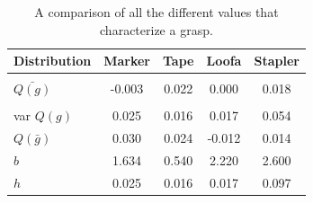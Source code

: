 \documentclass[letterpaper, 10 pt, conference]{ieeeconf}  %
\begin{document}
\begin{table}[ht!]
        \begin{tabular}{ l | c c c c}
         Distribution & \bf Marker & \bf Tape & \bf Loofa & \bf Stapler \\ 
        \hline \\
         $\bar{Q(g)}$ & -0.003 & 0.022 & 0.000 &  0.018\\
        \hline \\
        var $Q(g)$ & 0.025 & 0.016 & 0.017 &  0.054\\
        \hline 
        $Q(\bar{g})$ & 0.030 & 0.024 & -0.012 & 0.014\\
        \hline 
        $b$ & 1.634 & 0.540 & 2.220 & 2.600 \\
        \hline 
        $h$ & 0.025 & 0.016 & 0.017 & 0.097 \\
        \hline 
        \end{tabular}
        \caption{A comparison of all the different values that characterize a grasp.}
		
\vspace*{-20pt}
\end{table}



\end{document}
